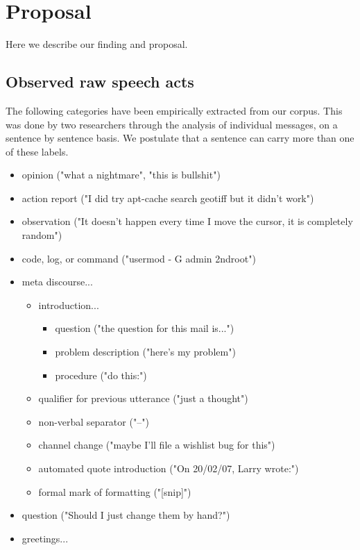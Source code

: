 \documentclass[11pt]{article}
\begin{document}
\section{Proposal}

Here we describe our finding and proposal.

\subsection{Observed raw speech acts}

The following categories have been empirically extracted from our corpus. This was done by two researchers through the analysis of individual messages, on a sentence by sentence basis. We postulate that a sentence can carry more than one of these labels.

\begin{itemize}
	\item opinion ("what a nightmare", "this is bullshit")
	\item action report ("I did try apt-cache search geotiff but it didn't work")
	\item observation ("It doesn't happen every time I move the cursor, it is completely random")
	\item code, log, or command ("usermod - G admin 2ndroot")
	\item meta discourse...
		\begin{itemize}
			\item introduction...
				\begin{itemize}
					\item question ("the question for this mail is...")
					\item problem description ("here's my problem")
					\item procedure ("do this:")
				\end{itemize}
			\item qualifier for previous utterance ("just a thought")
			\item non-verbal separator ("--")
			\item channel change ("maybe I'll file a wishlist bug for this")
			\item automated quote introduction ("On 20/02/07, Larry wrote:")
			\item formal mark of formatting ("[snip]")
		\end{itemize}
	\item question ("Should I just change them by hand?")
	\item greetings...

\end{itemize}
\end{document}

